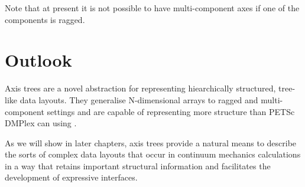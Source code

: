 \documentclass[thesis]{subfiles}
\begin{document}

Note that at present it is not possible to have multi-component axes if one of the components is ragged.

\section{Outlook}

Axis trees are a novel abstraction for representing hiearchically structured, tree-like data layouts.
They generalise \numpy{} N-dimensional arrays to ragged and multi-component settings and are capable of representing more structure than PETSc DMPlex can using .

As we will show in later chapters, axis trees provide a natural means to describe the sorts of complex data layouts that occur in continuum mechanics calculations in a way that retains important structural information and facilitates the development of expressive interfaces.
\end{document}
